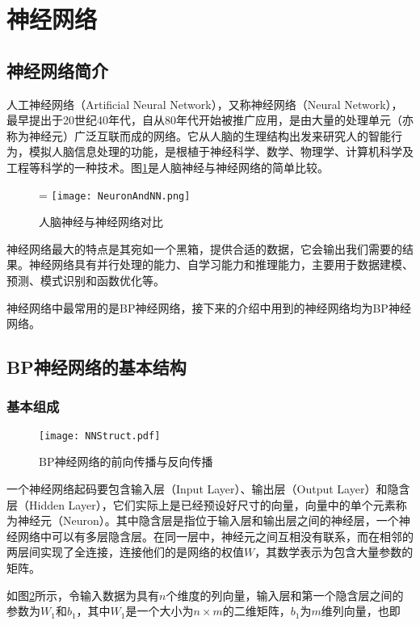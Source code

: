 \documentclass[bwprint]{cumcmthesis}
\begin{document}
\section{神经网络}

\subsection{神经网络简介}
人工神经网络（Artificial Neural Network），又称神经网络（Neural Network），最早提出于20世纪40年代，自从80年代开始被推广应用\cite{李硕2011科技传播}，是由大量的处理单元（亦称为神经元）广泛互联而成的网络。它从人脑的生理结构出发来研究人的智能行为，模拟人脑信息处理的功能，是根植于神经科学、数学、物理学、计算机科学及工程等科学的一种技术。图\ref{NeuronAndNN}是人脑神经与神经网络的简单比较。

\begin{figure}[!h]
	\centering=
	\texttt{[image: NeuronAndNN.png]}
	\caption{人脑神经与神经网络对比\cite{cs231n}}
	\label{NeuronAndNN}
\end{figure}


神经网络最大的特点是其宛如一个黑箱，提供合适的数据，它会输出我们需要的结果。神经网络具有并行处理的能力、自学习能力和推理能力，主要用于数据建模、预测、模式识别和函数优化等\cite{MATLAB}。


神经网络中最常用的是BP神经网络，接下来的介绍中用到的神经网络均为BP神经网络。

\subsection{BP神经网络的基本结构}

\subsubsection{基本组成}
\begin{figure}[!h]
	\centering
	\texttt{[image: NNStruct.pdf]}
	\caption{BP神经网络的前向传播与反向传播}
	\label{NNStruct}
\end{figure}
一个神经网络起码要包含输入层（Input Layer）、输出层（Output Layer）和隐含层（Hidden Layer），它们实际上是已经预设好尺寸的向量，向量中的单个元素称为神经元（Neuron）。其中隐含层是指位于输入层和输出层之间的神经层，一个神经网络中可以有多层隐含层。在同一层中，神经元之间互相没有联系，而在相邻的两层间实现了全连接，连接他们的是网络的权值$W$，其数学表示为包含大量参数的矩阵。

如图\ref{NNStruct}所示，令输入数据为具有$n$个维度的列向量，输入层和第一个隐含层之间的参数为$W_1$和$b_1$，其中$W_1$是一个大小为$n\times m$的二维矩阵，$b_1$为$m$维列向量，也即
\end{document}
